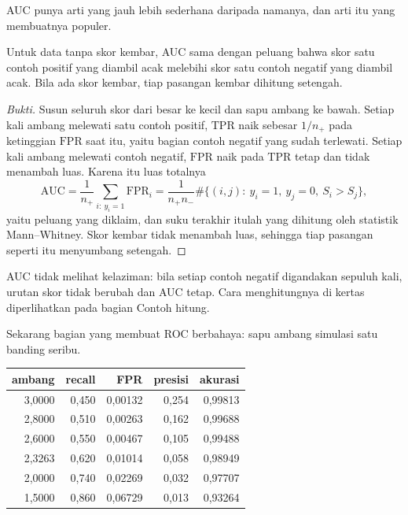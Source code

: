 AUC punya arti yang jauh lebih sederhana daripada namanya, dan arti itu yang membuatnya
populer.

\begin{proposisi}
Untuk data tanpa skor kembar, AUC sama dengan peluang bahwa skor satu contoh positif
yang diambil acak melebihi skor satu contoh negatif yang diambil acak. Bila ada skor
kembar, tiap pasangan kembar dihitung setengah.
\end{proposisi}

\begin{proof}[Bukti]
Susun seluruh skor dari besar ke kecil dan sapu ambang ke bawah. Setiap kali ambang
melewati satu contoh positif, $\mathrm{TPR}$ naik sebesar $1/n_+$ pada ketinggian
$\mathrm{FPR}$ saat itu, yaitu bagian contoh negatif yang sudah terlewati. Setiap kali
ambang melewati contoh negatif, $\mathrm{FPR}$ naik pada $\mathrm{TPR}$ tetap dan tidak
menambah luas. Karena itu luas totalnya
\[
\mathrm{AUC}=\frac1{n_+}\sum_{i:\ y_i=1}\mathrm{FPR}_i
=\frac{1}{n_+n_-}\#\{(i,j):\ y_i=1,\ y_j=0,\ S_i>S_j\},
\]
yaitu peluang yang diklaim, dan suku terakhir itulah yang dihitung oleh statistik
Mann--Whitney. Skor kembar tidak menambah luas, sehingga tiap pasangan seperti itu
menyumbang setengah.
\end{proof}

AUC tidak melihat kelaziman: bila setiap contoh negatif digandakan sepuluh kali, urutan
skor tidak berubah dan AUC tetap. Cara menghitungnya di kertas diperlihatkan pada bagian
Contoh hitung.

Sekarang bagian yang membuat ROC berbahaya: sapu ambang simulasi satu banding seribu.

\begin{center}
\small
\begin{tabular}{rrrrr}
\hline
ambang & recall & FPR & presisi & akurasi \\
\hline
3,0000 & 0,450 & 0,00132 & 0,254 & 0,99813 \\
2,8000 & 0,510 & 0,00263 & 0,162 & 0,99688 \\
2,6000 & 0,550 & 0,00467 & 0,105 & 0,99488 \\
2,3263 & 0,620 & 0,01014 & 0,058 & 0,98949 \\
2,0000 & 0,740 & 0,02269 & 0,032 & 0,97707 \\
1,5000 & 0,860 & 0,06729 & 0,013 & 0,93264 \\
\hline
\end{tabular}
\end{center}

